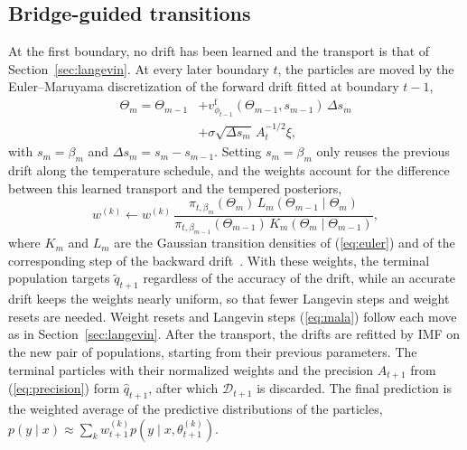 \subsection{Bridge-guided transitions}
\label{sec:transition}

At the first boundary, no drift has been learned and the transport is that of
Section~\ref{sec:langevin}. At every later boundary $t$, the particles are moved
by the Euler--Maruyama discretization of the forward drift fitted at boundary
$t-1$,
\begin{equation}
\begin{split}
    \Theta_{m}=\Theta_{m-1}
    &+v^{\mathrm{f}}_{\phi_{t-1}}(\Theta_{m-1},s_{m-1})\,\Delta s_m\\
    &+\sigma\sqrt{\Delta s_m}\,A_t^{-1/2}\xi,
\end{split}
    \label{eq:euler}
\end{equation}
with $s_m=\beta_m$ and $\Delta s_m=s_m-s_{m-1}$. Setting $s_m=\beta_m$ only
reuses the previous drift along the temperature schedule, and the weights
account for the difference between this learned transport and the tempered
posteriors,
\begin{equation}
    w^{(k)}\leftarrow w^{(k)}\,
    \frac{\pi_{t,\beta_m}(\Theta_m)\,L_m(\Theta_{m-1}\mid\Theta_m)}
         {\pi_{t,\beta_{m-1}}(\Theta_{m-1})\,K_m(\Theta_m\mid\Theta_{m-1})},
    \label{eq:bridgeweight}
\end{equation}
where $K_m$ and $L_m$ are the Gaussian transition densities of (\ref{eq:euler})
and of the corresponding step of the backward drift~\cite{delmoral2006smc}. With
these weights, the terminal population targets $\tilde q_{t+1}$ regardless of
the accuracy of the drift, while an accurate drift keeps the weights nearly
uniform, so that fewer Langevin steps and weight resets are needed. Weight
resets and Langevin steps (\ref{eq:mala}) follow each move as in
Section~\ref{sec:langevin}. After the transport, the drifts are refitted by IMF
on the new pair of populations, starting from their previous parameters. The
terminal particles with their normalized weights and the precision $A_{t+1}$
from (\ref{eq:precision}) form $\hat q_{t+1}$, after which $\mathcal{D}_{t+1}$ is
discarded. The final prediction is the weighted average of the predictive
distributions of the particles,
$p(y\mid x)\approx\sum_k w^{(k)}_{t+1}p(y\mid x,\theta^{(k)}_{t+1})$.
